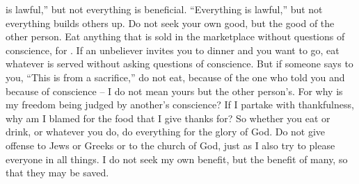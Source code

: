 {is lawful,”
but
not
everything
is beneficial.
“Everything
is lawful,”
but
not
everything
builds others up.
Do
not
seek
your own
good, but
the good of the other person.
Eat
anything
that is sold
in
the marketplace
without
questions
of
conscience,
for
{}.
If
an unbeliever
invites
you
to dinner and
you want
to go,
eat
whatever
is served
without
asking questions
of
conscience.
But
if
someone
says
to you,
“This
is
from a sacrifice,”
do
not
eat,
because of
the one
who told
you and
because of conscience –
I do
not
mean
yours
but
the other person’s.
For
why
is
my
freedom
being judged
by
another’s
conscience?
If
I
partake
with thankfulness,
why
am I blamed
for
the food that
I
give thanks for?
So
whether
you eat
or
drink,
or
whatever
you do,
do
everything
for
the glory
of God.
Do
not give
offense
to Jews
or
Greeks
or
to the church
of God,
just as
I also
try to please
everyone
in all things.
I do
not
seek
my own
benefit,
but
the benefit of many,
so that
they may be saved.

}
